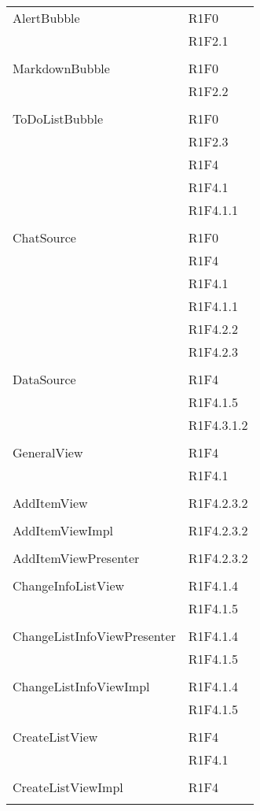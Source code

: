 \begin{center}
\begin{longtable}{|p{7cm}|p{5cm}|}
		AlertBubble & R1F0 \\ & R1F2.1 \\ & \\ \hline
		MarkdownBubble & R1F0 \\ & R1F2.2 \\ & \\ \hline
		ToDoListBubble & R1F0 \\ & R1F2.3 \\ & R1F4 \\ & R1F4.1 \\ & R1F4.1.1 \\ & \\ \hline
		ChatSource & R1F0 \\ & R1F4 \\ & R1F4.1 \\ & R1F4.1.1 \\ & R1F4.2.2 \\ & R1F4.2.3 \\ & \\ \hline
		DataSource & R1F4 \\ & R1F4.1.5 \\ & R1F4.3.1.2 \\ & \\ \hline
		GeneralView & R1F4 \\ & R1F4.1 \\ & \\ \hline
		AddItemView & R1F4.2.3.2 \\ & \\ \hline
		AddItemViewImpl & R1F4.2.3.2 \\ & \\ \hline
		AddItemViewPresenter & R1F4.2.3.2 \\ & \\ \hline
		ChangeInfoListView & R1F4.1.4 \\ & R1F4.1.5 \\ & \\ \hline
		ChangeListInfoViewPresenter & R1F4.1.4 \\ & R1F4.1.5 \\ & \\ \hline
		ChangeListInfoViewImpl & R1F4.1.4 \\ & R1F4.1.5 \\ & \\ \hline
		CreateListView & R1F4 \\ & R1F4.1 \\ & \\ \hline
		CreateListViewImpl & R1F4 \\ & \\ \hline

\end{longtable}
\end{center}

